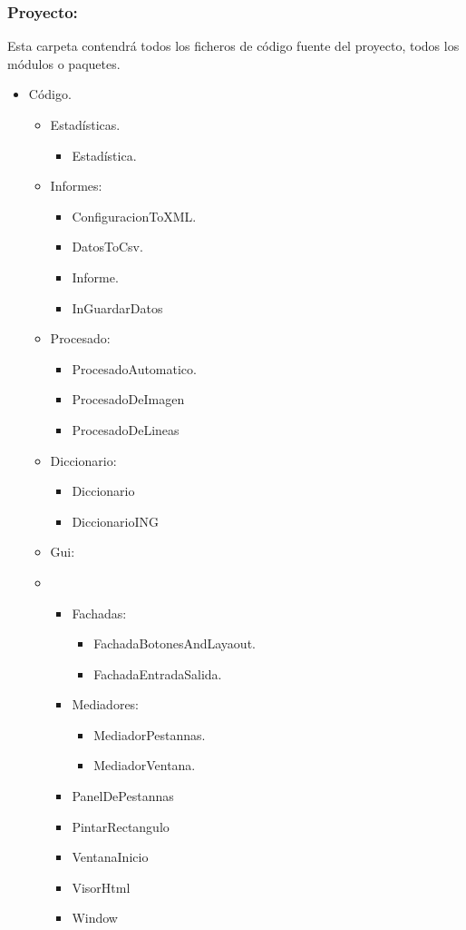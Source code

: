 \subsubsection{Proyecto:}
Esta carpeta contendrá todos los ficheros de código fuente del proyecto, todos los módulos o paquetes.
	\begin{itemize}
		\item Código.
		\begin{itemize}
			\item Estadísticas.
				\begin{itemize}
					\item Estadística.
				\end{itemize}
			\item Informes:
				\begin{itemize}
					\item ConfiguracionToXML.
					\item DatosToCsv.
					\item Informe.
					\item InGuardarDatos
				\end{itemize}
			\item Procesado:
				\begin{itemize}
					\item ProcesadoAutomatico.
					\item ProcesadoDeImagen
					\item ProcesadoDeLineas
				\end{itemize}
		\item Diccionario:
			\begin{itemize}
				\item Diccionario
				\item DiccionarioING
			\end{itemize}	
		\item Gui:
	\end{itemize}
	

\begin{itemize}
\item   
\begin{itemize}
		\item Fachadas:
			\begin{itemize}
				\item FachadaBotonesAndLayaout.
				\item FachadaEntradaSalida.
			\end{itemize}
		\item Mediadores:
			\begin{itemize}
				\item MediadorPestannas.
				\item MediadorVentana.
			\end{itemize}
		\item PanelDePestannas
		\item PintarRectangulo
		\item VentanaInicio
		\item VisorHtml
		\item Window
	\end{itemize}						
\end{itemize}
\end{itemize}

